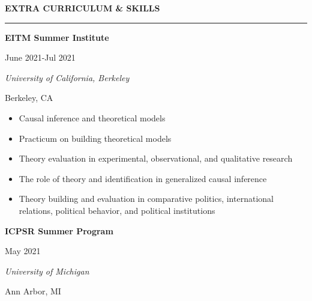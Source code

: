 \documentclass[
  16,
]{article}
\providecommand{\tightlist}{%
  \setlength{\itemsep}{0pt}\setlength{\parskip}{0pt}}\usepackage{longtable,booktabs,array}
\begin{document}
\begin{large}
  {\bf EXTRA CURRICULUM \& SKILLS}
  \vspace{3pt}
  \end{large}
  \hrule
  \begin{multicols}{2}
    \begin{flushleft}{\bf EITM Summer Institute}\end{flushleft}
    \begin{flushright}June 2021-Jul 2021\end{flushright}
  \end{multicols}
    \begin{multicols}{2}
    \begin{flushleft}{\it University of California, Berkeley}\end{flushleft}
    \begin{flushright}Berkeley, CA\end{flushright}
  \end{multicols}
  \vspace{-0.17cm}

\begin{itemize}
\tightlist
\item
  Causal inference and theoretical models
\item
  Practicum on building theoretical models
\item
  Theory evaluation in experimental, observational, and qualitative
  research
\item
  The role of theory and identification in generalized causal inference
\item
  Theory building and evaluation in comparative politics, international
  relations, political behavior, and political institutions
\end{itemize}

\vspace{7pt}

  \begin{multicols}{2}
    \begin{flushleft}{\bf ICPSR Summer Program}\end{flushleft}
    \begin{flushright}May 2021\end{flushright}
  \end{multicols}
    \begin{multicols}{2}
    \begin{flushleft}{\it University of Michigan}\end{flushleft}
    \begin{flushright}Ann Arbor, MI\end{flushright}
  \end{multicols}
  \vspace{-0.17cm}
\end{document}
